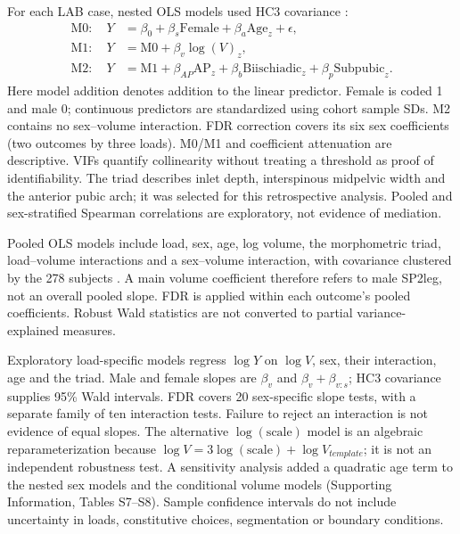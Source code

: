 For each LAB case, nested OLS models used HC3 covariance \citep{MacKinnonWhite1985}:
\begin{align}
\mathrm{M0}:\quad Y&=\beta_0+\beta_s\mathrm{Female}+\beta_a\mathrm{Age}_z+\epsilon,\label{eq:m0}\\
\mathrm{M1}:\quad Y&=\mathrm{M0}+\beta_v\log(V)_z,\label{eq:m1}\\
\mathrm{M2}:\quad Y&=\mathrm{M1}+\beta_{AP}\mathrm{AP}_z+\beta_b\mathrm{Biischiadic}_z+\beta_p\mathrm{Subpubic}_z.\label{eq:m2}
\end{align}
Here model addition denotes addition to the linear predictor. Female is coded 1 and male 0; continuous predictors are standardized using cohort sample SDs. M2 contains no sex--volume interaction. FDR correction covers its six sex coefficients (two outcomes by three loads). M0/M1 and coefficient attenuation are descriptive. VIFs quantify collinearity without treating a threshold as proof of identifiability. The triad describes inlet depth, interspinous midpelvic width and the anterior pubic arch; it was selected for this retrospective analysis. Pooled and sex-stratified Spearman correlations are exploratory, not evidence of mediation.

Pooled OLS models include load, sex, age, log volume, the morphometric triad, load--volume interactions and a sex--volume interaction, with covariance clustered by the 278 subjects \citep{CameronMiller2015}. A main volume coefficient therefore refers to male SP2leg, not an overall pooled slope. FDR is applied within each outcome's pooled coefficients. Robust Wald statistics are not converted to partial variance-explained measures.

Exploratory load-specific models regress $\log Y$ on $\log V$, sex, their interaction, age and the triad. Male and female slopes are $\beta_v$ and $\beta_v+\beta_{v:s}$; HC3 covariance supplies 95\% Wald intervals. FDR covers 20 sex-specific slope tests, with a separate family of ten interaction tests. Failure to reject an interaction is not evidence of equal slopes. The alternative $\log(\mathrm{scale})$ model is an algebraic reparameterization because $\log V=3\log(\mathrm{scale})+\log V_{template}$; it is not an independent robustness test. A sensitivity analysis added a quadratic age term to the nested sex models and the conditional volume models (Supporting Information, Tables S7--S8). Sample confidence intervals do not include uncertainty in loads, constitutive choices, segmentation or boundary conditions.
